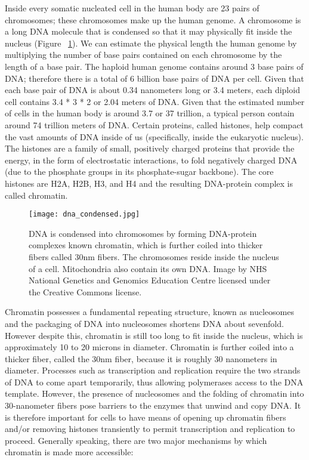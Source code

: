 Inside every somatic nucleated cell in the human body are 23 pairs of chromosomes; these chromosomes make up the human genome. A chromosome is a long DNA molecule that is condensed so that it may physically fit inside the nucleus (Figure ~\ref{fig:dna_condensed}). We can estimate the physical length the human genome by multiplying the number of base pairs contained on each chromosome by the length of a base pair. The haploid human genome contains around 3 base pairs of DNA; therefore there is a total of 6 billion base pairs of DNA per cell. Given that each base pair of DNA is about 0.34 nanometers long or 3.4 meters\cite{pmid7354864}, each diploid cell contains 3.4 * 3 * 2 or 2.04 meters of DNA. Given that the estimated number of cells in the human body is around 3.7 or 37 trillion\cite{pmid23829164}, a typical person contain around 74 trillion meters of DNA. Certain proteins, called histones, help compact the vast amounts of DNA inside of us (specifically, inside the eukaryotic nucleus). The histones are a family of small, positively charged proteins that provide the energy, in the form of electrostatic interactions, to fold negatively charged DNA (due to the phosphate groups in its phosphate-sugar backbone). The core histones are H2A, H2B, H3, and H4 and the resulting DNA-protein complex is called chromatin.

\begin{figure}[h]
   \centering
   \texttt{[image: dna\_condensed.jpg]}
   \caption[Condensation of DNA]{DNA is condensed into chromosomes by forming DNA-protein complexes known chromatin, which is further coiled into thicker fibers called 30nm fibers. The chromosomes reside inside the nucleus of a cell. Mitochondria also contain its own DNA. Image by NHS National Genetics and Genomics Education Centre licensed under the Creative Commons license.}
   \label{fig:dna_condensed}
\end{figure}

Chromatin possesses a fundamental repeating structure\cite{holde01111974}, known as nucleosomes and the packaging of DNA into nucleosomes shortens DNA about sevenfold. However despite this, chromatin is still too long to fit inside the nucleus, which is approximately 10 to 20 microns in diameter. Chromatin is further coiled into a thicker fiber, called the 30nm fiber, because it is roughly 30 nanometers in diameter. Processes such as transcription and replication require the two strands of DNA to come apart temporarily, thus allowing polymerases access to the DNA template. However, the presence of nucleosomes and the folding of chromatin into 30-nanometer fibers pose barriers to the enzymes that unwind and copy DNA. It is therefore important for cells to have means of opening up chromatin fibers and/or removing histones transiently to permit transcription and replication to proceed. Generally speaking, there are two major mechanisms by which chromatin is made more accessible:

